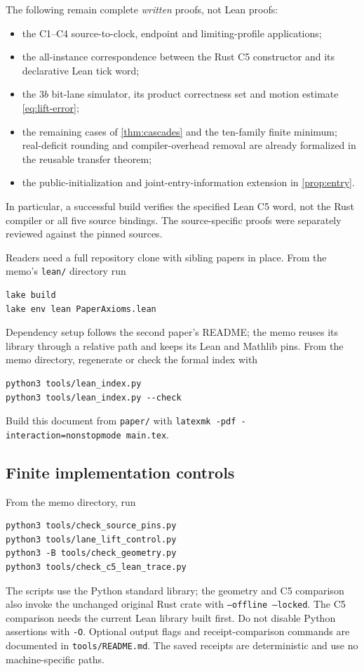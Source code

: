 The following remain complete \emph{written} proofs, not Lean proofs:
\begin{itemize}
\item the C1--C4 source-to-clock, endpoint and limiting-profile applications;
\item the all-instance correspondence between the Rust C5 constructor
      and its declarative Lean tick word;
\item the $3b$ bit-lane simulator, its product correctness set and
      motion estimate \eqref{eq:lift-error};
\item the remaining cases of \cref{thm:cascades} and the ten-family
      finite minimum; real-deficit rounding and compiler-overhead removal
      are already formalized in the reusable transfer theorem;
\item the public-initialization and joint-entry-information extension
      in \cref{prop:entry}.
\end{itemize}
In particular, a successful build verifies the specified Lean C5 word,
not the Rust compiler or all five source bindings. The source-specific
proofs were separately reviewed against the pinned sources.

Readers need a full repository clone with sibling papers in place.
From the memo's \texttt{lean/} directory run
\begin{verbatim}
lake build
lake env lean PaperAxioms.lean
\end{verbatim}
Dependency setup follows the second paper's README; the memo reuses its
library through a relative path and keeps its Lean and Mathlib pins.
From the memo directory, regenerate or check the formal index with
\begin{verbatim}
python3 tools/lean_index.py
python3 tools/lean_index.py --check
\end{verbatim}
Build this document from \texttt{paper/} with
\texttt{latexmk -pdf -interaction=nonstopmode main.tex}.

\subsection{Finite implementation controls}

From the memo directory, run
\begin{verbatim}
python3 tools/check_source_pins.py
python3 tools/lane_lift_control.py
python3 -B tools/check_geometry.py
python3 tools/check_c5_lean_trace.py
\end{verbatim}
The scripts use the Python standard library; the geometry and C5 comparison
also invoke the unchanged original Rust crate with \texttt{--offline --locked}.
The C5 comparison needs the current Lean library built first. Do not
disable Python assertions with \texttt{-O}. Optional output flags and
receipt-comparison commands are documented in \texttt{tools/README.md}.
The saved receipts are deterministic and use no machine-specific paths.

